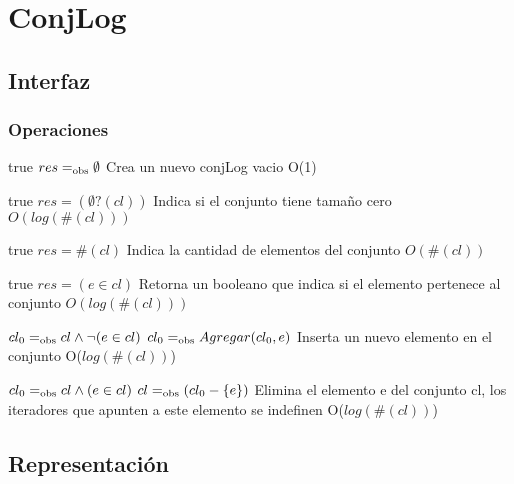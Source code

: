 \section{ConjLog}

\subsection{Interfaz}



\subsubsection*{Operaciones}

{true}
{$res =_{\mathrm{obs}} \emptyset$}
{Crea un nuevo conjLog vacio}
{O(1)}
{}

{true}
{$res = (\emptyset?(cl))$}
{Indica si el conjunto tiene tamaño cero}
{$O(log(\#(cl)))$}
{}

{true}
{$res = \#(cl)$}
{Indica la cantidad de elementos del conjunto}
{$O(\#(cl))$}
{}

{true}
{$res = (e \in cl)$}
{Retorna un booleano que indica si el elemento pertenece al conjunto}
{$O(log(\#(cl)))$}
{}

{$cl_0 =_{\mathrm{obs}} cl \land \neg(e \in cl)$}
{$cl_0 =_{\mathrm{obs}} Agregar(cl_0, e)$}
{Inserta un nuevo elemento en el conjunto}
{O($log(\#(cl))$)}
{}

{$cl_0 =_{\mathrm{obs}} cl \land (e \in cl)$}
{$cl =_{\mathrm{obs}} (cl_0 - \{e\})$}
{Elimina el elemento e del conjunto cl, los iteradores que apunten a este elemento se indefinen}
{O($log(\#(cl))$)}
{}

\subsection{Representación}


